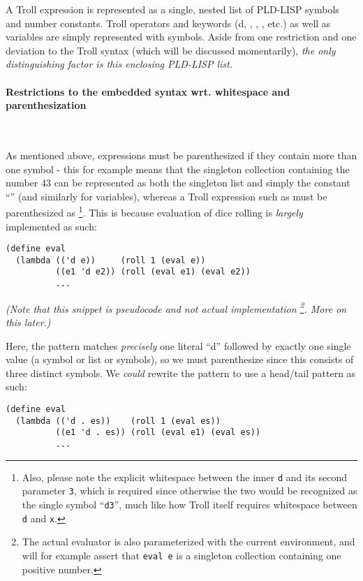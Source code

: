 A Troll expression is represented as a single, nested list of PLD-LISP symbols
and number constants. Troll operators and keywords (\ms d, ,
\ms{+}, , etc.) as well as variables are simply represented with
symbols. Aside from one restriction and one deviation to the Troll syntax (which
will be discussed momentarily), \emph{the only distinguishing factor is this
enclosing PLD-LISP list.}


\paragraph{Restrictions to the embedded syntax wrt. whitespace and
parenthesization}~\smallskip

As mentioned above, expressions must be parenthesized if they contain more
than one symbol - this for example means that the singleton collection
containing the number 43 can be represented as both the singleton list
 and simply the constant ``'' (and similarly for variables),
whereas a Troll expression such as  must be parenthesized as
\footnote{Also, please note the explicit whitespace between the
inner \texttt d and its second parameter \texttt 3, which is required since
otherwise the two would be recognized as the single symbol ``\texttt{d3}'', much
like how Troll itself requires whitespace between \texttt d and \texttt x.}.
This is because evaluation of dice rolling is \emph{largely} implemented as
such:

\begin{verbatim}
(define eval
  (lambda (('d e))     (roll 1 (eval e))
          ((e1 'd e2)) (roll (eval e1) (eval e2))
          ...
\end{verbatim}

\emph{(Note that this snippet is pseudocode and not actual implementation
\footnote{The actual evaluator is also parameterized with the current
environment, and will for example assert that \texttt{eval e} is a singleton
collection containing one positive number.}. More on this later.)}

\smallskip

Here, the  pattern matches \emph{precisely} one literal ``\ms d''
followed by exactly one single value (a symbol or list or symbols), so we must
parenthesize  since this consists of three distinct symbols. We
\emph{could} rewrite the  pattern to use a head/tail pattern as such:

\begin{verbatim}
(define eval
  (lambda (('d . es))    (roll 1 (eval es))
          ((e1 'd . es)) (roll (eval e1) (eval es))
          ...
\end{verbatim}

